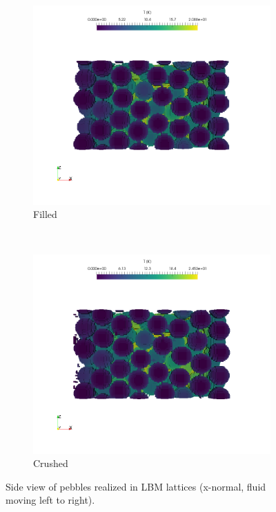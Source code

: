 \begin{figure}[!ht]
    \centering
    \begin{subfigure}[b]{0.44\textwidth}
        \includegraphics[trim={6cm 6cm 5cm 0cm},clip,width = \textwidth]{figures/lbm/lbm-pebbles-y-normal-filled}
        \caption{Filled}\label{fig:lbm-pebble-temperatures-filled-y}
    \end{subfigure}
    ~
    \begin{subfigure}[b]{0.44\textwidth}
        \includegraphics[trim={6cm 6cm 5cm 0cm},clip, width = \textwidth]{figures/lbm/lbm-pebbles-y-normal-crushed}
        \caption{Crushed}\label{fig:lbm-pebble-temperatures-crushed-y}
    \end{subfigure}
    \caption{Side view of pebbles realized in LBM lattices (x-normal, fluid moving left to right).}\label{fig:lbm-pebble-temperatures-y}
\end{figure}
\FloatBarrier

